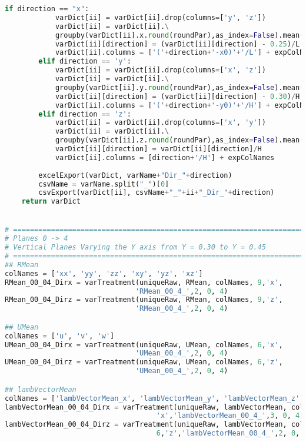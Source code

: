 \begin{lstlisting}[language=python]
        if direction == "x":
            varDict[ii] = varDict[ii].drop(columns=['y', 'z'])
            varDict[ii] = varDict[ii].\
            groupby(varDict[ii].x.round(roundPar),as_index=False).mean()
            varDict[ii][direction] = (varDict[ii][direction] - 0.25)/L
            varDict[ii].columns = ['('+direction+'-x0)'+'/L'] + expColNames
        elif direction == 'y':
            varDict[ii] = varDict[ii].drop(columns=['x', 'z'])
            varDict[ii] = varDict[ii].\
            groupby(varDict[ii].y.round(roundPar),as_index=False).mean()
            varDict[ii][direction] = (varDict[ii][direction] - 0.30)/H
            varDict[ii].columns = ['('+direction+'-y0)'+'/H'] + expColNames
        elif direction == 'z':
            varDict[ii] = varDict[ii].drop(columns=['x', 'y'])
            varDict[ii] = varDict[ii].\
            groupby(varDict[ii].z.round(roundPar),as_index=False).mean()
            varDict[ii][direction] = varDict[ii][direction]/H
            varDict[ii].columns = [direction+'/H'] + expColNames
            
        excelExport(varDict, varName+"Dir_"+direction)
        csvName = varName.split("_")[0]
        csvExport(varDict[ii], csvName+"_"+ii+"_Dir_"+direction)
    return varDict


# =============================================================================
# Planes 0 -> 4
# Vertical Planes Varying the Y axis from Y = 0.30 to Y = 0.45
# =============================================================================
## RMean
colNames = ['xx', 'yy', 'zz', 'xy', 'yz', 'xz']
RMean_00_04_Dirx = varTreatment(uniqueRaw, RMean, colNames, 9,'x',
                               'RMean_00_4_',2, 0, 4)
RMean_00_04_Dirz = varTreatment(uniqueRaw, RMean, colNames, 9,'z',
                               'RMean_00_4_',2, 0, 4)

## UMean
colNames = ['u', 'v', 'w']
UMean_00_04_Dirx = varTreatment(uniqueRaw, UMean, colNames, 6,'x',
                               'UMean_00_4_',2, 0, 4)
UMean_00_04_Dirz = varTreatment(uniqueRaw, UMean, colNames, 6,'z',
                               'UMean_00_4_',2, 0, 4)

## lambVectorMean
colNames = ['lambVectorMean_x', 'lambVectorMean_y', 'lambVectorMean_z']
lambVectorMean_00_04_Dirx = varTreatment(uniqueRaw, lambVectorMean, colNames, 6,
                                    'x','lambVectorMean_00_4_',3, 0, 4)
lambVectorMean_00_04_Dirz = varTreatment(uniqueRaw, lambVectorMean, colNames,
                                    6,'z','lambVectorMean_00_4_',2, 0, 4)


\end{lstlisting}
